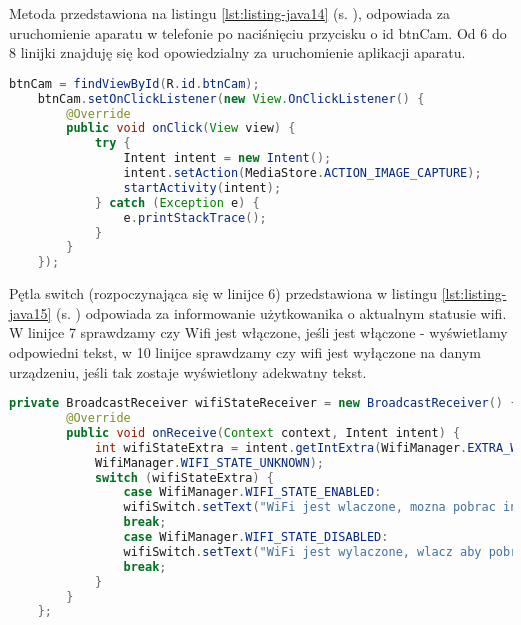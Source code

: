 \newpage

Metoda przedstawiona na listingu \ref{lst:listing-java14} (s. \pageref{lst:listing-java14}), odpowiada za uruchomienie aparatu w telefonie po naciśnięciu przycisku o id btnCam. Od 6 do 8 linijki znajduję się kod opowiedzialny za uruchomienie aplikacji aparatu.
\begin{lstlisting}[caption=Aparat - Włączenie aparatu, label={lst:listing-java14}, language=Java]
	btnCam = findViewById(R.id.btnCam);
	btnCam.setOnClickListener(new View.OnClickListener() {
		@Override
		public void onClick(View view) {
			try {
				Intent intent = new Intent();
				intent.setAction(MediaStore.ACTION_IMAGE_CAPTURE);
				startActivity(intent);
			} catch (Exception e) {
				e.printStackTrace();
			}
		}
	});
\end{lstlisting}

Pętla switch (rozpoczynająca się w linijce 6) przedstawiona w listingu \ref{lst:listing-java15} (s. \pageref{lst:listing-java15}) odpowiada za informowanie użytkowanika o aktualnym statusie wifi. W linijce 7 sprawdzamy czy Wifi jest włączone, jeśli jest włączone - wyświetlamy odpowiedni tekst, w 10 linijce sprawdzamy czy wifi jest wyłączone na danym urządzeniu, jeśli tak zostaje wyświetlony adekwatny tekst.
\begin{lstlisting}[caption=Wifi - Sprawdzenie statusu Wifi, label={lst:listing-java15}, language=Java]
	private BroadcastReceiver wifiStateReceiver = new BroadcastReceiver() {
		@Override
		public void onReceive(Context context, Intent intent) {
			int wifiStateExtra = intent.getIntExtra(WifiManager.EXTRA_WIFI_STATE,
			WifiManager.WIFI_STATE_UNKNOWN);
			switch (wifiStateExtra) {
				case WifiManager.WIFI_STATE_ENABLED:
				wifiSwitch.setText("WiFi jest wlaczone, mozna pobrac informacje");
				break;
				case WifiManager.WIFI_STATE_DISABLED:
				wifiSwitch.setText("WiFi jest wylaczone, wlacz aby pobrac informacje");
				break;
			}
		}
	};
\end{lstlisting}

\newpage

